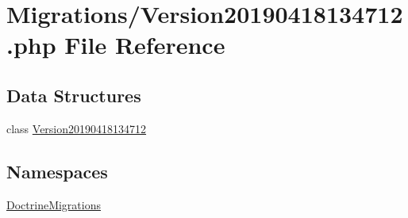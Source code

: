 \hypertarget{_version20190418134712_8php}{}\section{Migrations/\+Version20190418134712.php File Reference}
\label{_version20190418134712_8php}
\subsection*{Data Structures}
\begin{DoxyCompactItemize}
\item 
class \mbox{\hyperlink{class_doctrine_migrations_1_1_version20190418134712}{Version20190418134712}}
\end{DoxyCompactItemize}
\subsection*{Namespaces}
\begin{DoxyCompactItemize}
\item 
 \mbox{\hyperlink{namespace_doctrine_migrations}{Doctrine\+Migrations}}
\end{DoxyCompactItemize}
